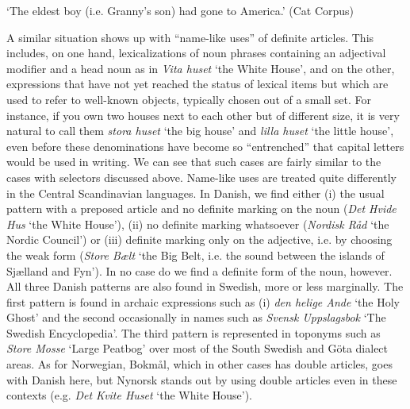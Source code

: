 \begin{styleTranslation}
‘The eldest boy (i.e. Granny’s son) had gone to America.’ (Cat Corpus)

\end{styleTranslation}

\begin{styleBodyTextFirst}
A similar situation shows up with “name-like uses” of definite articles. This includes, on one hand, lexicalizations of noun phrases containing an adjectival modifier and a head noun as in \textit{Vita huset} ‘the White House’, and on the other, expressions that have not yet reached the status of lexical items but which are used to refer to well-known objects, typically chosen out of a small set. For instance, if you own two houses next to each other but of different size, it is very natural to call them \textit{stora huset} ‘the big house’ and \textit{lilla huset} ‘the little house’, even before these denominations have become so “entrenched” that capital letters would be used in writing. We can see that such cases are fairly similar to the cases with selectors discussed above. Name-like uses are treated quite differently in the Central Scandinavian languages. In Danish, we find either (i) the usual pattern with a preposed article and no definite marking on the noun (\textit{Det Hvide Hus} ‘the White House’), (ii) no definite marking whatsoever (\textit{Nordisk Råd} ‘the Nordic Council’) or (iii) definite marking only on the adjective, i.e. by choosing the weak form (\textit{Store Bælt} ‘the Big Belt, i.e. the sound between the islands of Sjælland and Fyn’). In no case do we find a definite form of the noun, however. All three Danish patterns are also found in Swedish, more or less marginally. The first pattern is found in archaic expressions such as (i) \textit{den helige Ande} ‘the Holy Ghost’ and the second occasionally in names such as  \textit{Svensk Uppslagsbok} ‘The Swedish Encyclopedia’. The third pattern is represented in toponyms such as \textit{Store Mosse} ‘Large Peatbog’ over most of the South Swedish and Göta dialect areas. As for Norwegian, Bokmål, which in other cases has double articles, goes with Danish here, but Nynorsk stands out by using double articles even in these contexts (e.g. \textit{Det Kvite Huset} ‘the White House’). 

\end{styleBodyTextFirst}

